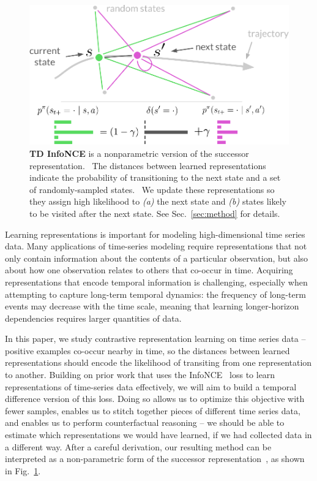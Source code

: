 \documentclass{article} %
\begin{document}
\begin{figure}
    \centering
    \includegraphics[width=\linewidth]{figures/td_infonce.pdf}
    \caption{\footnotesize \textbf{TD InfoNCE} is a nonparametric version of the successor representation. 
    \figtop \, The distances between learned representations indicate the probability of transitioning to the next state and a set of randomly-sampled states. 
    \figbottom \, We update these representations so they assign high likelihood to \emph{(a)} the next state and \emph{(b)} states likely to be visited after the next state. See Sec.~\ref{sec:method} for details.}
    \label{fig:method}
    \vspace{-1em}
\end{figure}

Learning representations is important for modeling high-dimensional time series data. Many applications of time-series modeling require representations that not only contain information about the contents of a particular observation, but also about how one observation relates to others that co-occur in time.
Acquiring representations that encode temporal information is challenging, especially when attempting to capture long-term temporal dynamics: the frequency of long-term events may decrease with the time scale, meaning that learning longer-horizon dependencies requires larger quantities of data.

In this paper, we study contrastive representation learning on time series data -- positive examples co-occur nearby in time, so the distances between learned representations should encode the likelihood of transiting from one representation to another.
Building on prior work that uses the InfoNCE~\citep{sohn2016improved, oord2018representation} loss to learn representations of time-series data effectively, we will aim to build a temporal difference version of this loss.
Doing so allows us to optimize this objective with fewer samples, enables us to stitch together pieces of different time series data, and enables us to perform counterfactual reasoning -- we should be able to estimate which representations we would have learned, if we had collected data in a different way. After a careful derivation, our resulting method can be interpreted as a non-parametric form of the successor representation~\citep{dayan1993improving}, as shown in Fig.~\ref{fig:method}.
\end{document}
